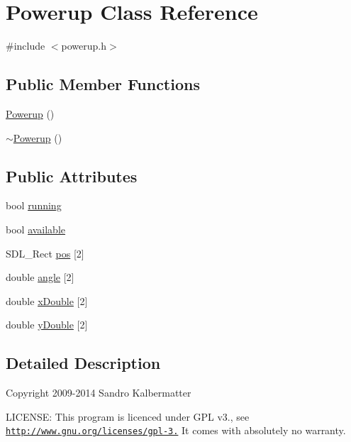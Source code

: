 \hypertarget{classPowerup}{}\section{Powerup Class Reference}
\label{classPowerup}


{\ttfamily \#include $<$powerup.\+h$>$}

\subsection*{Public Member Functions}
\begin{DoxyCompactItemize}
\item 
\hyperlink{classPowerup_a20c3efe6b86d6f358a57f8215d157b20}{Powerup} ()
\item 
\hyperlink{classPowerup_a2e1c97859d671527885e6f4eb200ca3f}{$\sim$\+Powerup} ()
\end{DoxyCompactItemize}
\subsection*{Public Attributes}
\begin{DoxyCompactItemize}
\item 
bool \hyperlink{classPowerup_a8e8bb44d2f49ffa3b1597659a347b152}{running}
\item 
bool \hyperlink{classPowerup_a1840f01aa4f833c817d6b15c3c9937d1}{available}
\item 
S\+D\+L\+\_\+\+Rect \hyperlink{classPowerup_a2a54f29f4d6dda924142d2e25ed708f3}{pos} \mbox{[}2\mbox{]}
\item 
double \hyperlink{classPowerup_a1cfed890c583d8266e369ccd43ba8b17}{angle} \mbox{[}2\mbox{]}
\item 
double \hyperlink{classPowerup_a2fc3cbe71c54a30e783d0a4bf0a0621e}{x\+Double} \mbox{[}2\mbox{]}
\item 
double \hyperlink{classPowerup_a744b567364acc03b432218fcfdc9d969}{y\+Double} \mbox{[}2\mbox{]}
\end{DoxyCompactItemize}


\subsection{Detailed Description}
Copyright 2009-\/2014 Sandro Kalbermatter

L\+I\+C\+E\+N\+S\+E\+: This program is licenced under G\+P\+L v3., see \href{http://www.gnu.org/licenses/gpl-3.0}{\tt http\+://www.\+gnu.\+org/licenses/gpl-\/3.} It comes with absolutely no warranty. 

